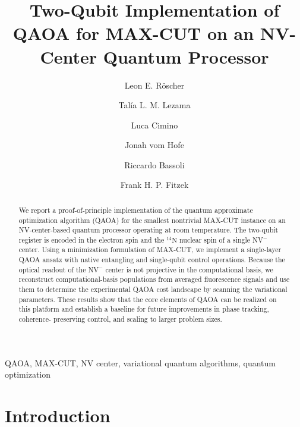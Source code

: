 \documentclass[conference]{IEEEtran}
\begin{document}

\title{Two-Qubit Implementation of QAOA for MAX-CUT on an NV-Center Quantum Processor}
\author[1, 3]{Leon E. Röscher}
\author[1, 3]{Talía L. M. Lezama}
\author[3, 4]{Luca Cimino}
\author[1, 3]{Jonah vom Hofe}
\author[1,2,3]{\authorcr Riccardo Bassoli} 
\author[1,2]{Frank H. P. Fitzek}



\maketitle


\begin{abstract}
We report a proof-of-principle implementation of the quantum approximate
optimization algorithm (QAOA) for the smallest nontrivial MAX-CUT instance on an
NV-center-based quantum processor operating at room temperature. The two-qubit
register is encoded in the electron spin and the \({}^{14}\mathrm{N}\) nuclear
spin of a single NV\(^-\) center. Using a minimization formulation of MAX-CUT,
we implement a single-layer QAOA ansatz with native entangling and single-qubit
control operations. Because the optical readout of the NV\(^-\) center is not
projective in the computational basis, we reconstruct computational-basis
populations from averaged fluorescence signals and use them to determine the
experimental QAOA cost landscape by scanning the variational parameters. These
results show that the core elements of QAOA can be realized on this platform and
establish a baseline for future improvements in phase tracking, coherence-
preserving control, and scaling to larger problem sizes.
\end{abstract}

\begin{IEEEkeywords}
QAOA, MAX-CUT, NV center, variational quantum algorithms, quantum optimization
\end{IEEEkeywords}

\section{Introduction}
\end{document}
